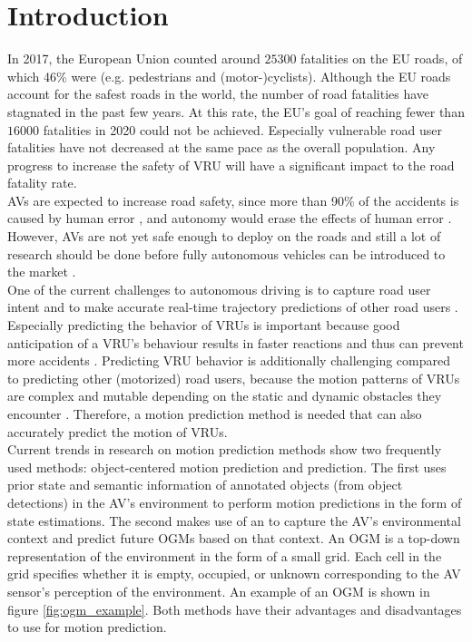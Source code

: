 \section{Introduction} \label{sec:intro}
In 2017, the European Union counted around $25300$ fatalities on the EU roads, of which 46\% were  (e.g. pedestrians and (motor-)cyclists). Although the EU roads account for the safest roads in the world, the number of road fatalities have stagnated in the past few years. At this rate, the EU's goal of reaching fewer than $16000$ fatalities in 2020 could not be achieved. Especially vulnerable road user fatalities have not decreased at the same pace as the overall population. Any progress to increase the safety of \gls{VRU} will have a significant impact to the road fatality rate. \cite{vademecumeu2018road} \\

\glspl{AV} are expected to increase road safety, since more than 90\% of the accidents is caused by human error \cite{eu2020website}, and autonomy would erase the effects of human error \cite{cui2019review}. However, \glspl{AV} are not yet safe enough to deploy on the roads and still a lot of research should be done before fully autonomous vehicles can be introduced to the market \cite{okuda2014survey} \cite{cui2019review}. \\

One of the current challenges to autonomous driving is to capture road user intent and to make accurate real-time trajectory predictions of other road users \cite{ohn2016looking}. Especially predicting the behavior of \glspl{VRU} is important \cite{ohn2016looking} \cite{cara2015classification} because good anticipation of a \gls{VRU}'s behaviour results in faster reactions and thus can prevent more accidents \cite{djuric2020uncertainty}. Predicting \gls{VRU} behavior is additionally challenging compared to predicting other (motorized) road users, because the motion patterns of \glspl{VRU} are complex and mutable depending on the static and dynamic obstacles they encounter \cite{chou2020predicting}. Therefore, a motion prediction method is needed that can also accurately predict the motion of \glspl{VRU}.\\

Current trends in research on motion prediction methods show two frequently used methods: object-centered motion prediction and  prediction. The first uses prior state and semantic information of annotated objects (from object detections) in the \gls{AV}'s environment to perform motion predictions in the form of state estimations. The second makes use of an  to capture the \gls{AV}'s environmental context and predict future \glspl{OGM} based on that context. An \gls{OGM} is a top-down representation of the environment in the form of a small grid. Each cell in the grid specifies whether it is empty, occupied, or unknown corresponding to the \gls{AV} sensor's perception of the environment. An example of an \gls{OGM} is shown in figure \ref{fig:ogm_example}. Both methods have their advantages and disadvantages to use for motion prediction. \\

